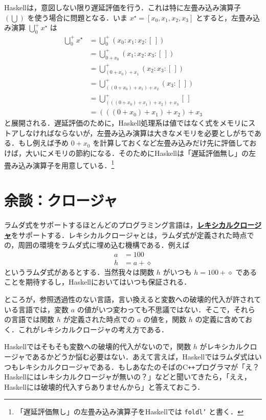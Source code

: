 \documentclass[a4paper,twocolumn]{jsbook}
\newcommand{\programminglanguage}[1]{\textsf{#1}}
\newcommand{\cxx}{\programminglanguage{C}\texttt{++}}
\newcommand{\haskell}{\programminglanguage{Haskell}}
\newcommand{\keyword}[1]{{\underline{\textbf{#1}}}}
\newcommand{\code}[1]{\texttt{#1}}
\newcommand{\mEmptyList}{{[\,]}}
\newcommand{\mAnonParam}{\diamond}
\DeclareMathOperator*{\mFold}{\bigcup}
\newcommand{\mListWith}[1]{\left[#1\right]}
\newcommand{\mList}[1]{{#1}^\mathrm{\star}}
\begin{document}
\haskell は，意図しない限り遅延評価を行う．これは特に左畳み込み演算子 $(\mFold)$ を使う場合に問題となる．いま $\mList{x}=\mListWith{x_0,x_1,x_2,x_3}$ とすると，左畳み込み演算 $\mFold^+_0\mList{x}$ は
\begin{align}
\mFold^+_0\mList{x}&=\mFold^+_0{}(x_0:x_1:x_2:\mEmptyList)\\
&=\mFold^+_{0+x_0}{}(x_1:x_2:x_3:\mEmptyList)\\
&=\mFold^+_{(0+x_0)+x_1}{}(x_2:x_3:\mEmptyList)\\
&=\mFold^+_{((0+x_0)+x_1)+x_2}{}(x_3:\mEmptyList)\\
&=\mFold^+_{(((0+x_0)+x_1)+x_2)+x_3}{}\mEmptyList\\
&=(((0+x_0)+x_1)+x_2)+x_3
\end{align}
と展開される．遅延評価のために，\haskell 処理系は値ではなく式をメモリにストアしなければならないが，左畳み込み演算は大きなメモリを必要としがちである．もし例えば予め $0+x_0$ を計算しておくなど左畳み込みだけ先に評価しておけば，大いにメモリの節約になる．そのために\haskell は「遅延評価無し」の左畳み込み演算子を用意している．\footnote{「遅延評価無し」の左畳み込み演算子を\haskell では \code{foldl'} と書く．}


% 

\section{余談：クロージャ}

ラムダ式をサポートするほとんどのプログラミング言語は，\keyword{レキシカルクロージャ}をサポートする．レキシカルクロージャとは，ラムダ式が定義された時点での，周囲の環境をラムダ式に埋め込む機構である．例えば
\begin{align}
a&=100\\
h&=a+\mAnonParam
\end{align}
というラムダ式があるとする．当然我々は関数 $h$ がいつも $h=100+\mAnonParam$ であることを期待するし，\haskell においてはいつも保証される．

ところが，参照透過性のない言語，言い換えると変数への破壊的代入が許されている言語では，変数 $a$ の値がいつ変わっても不思議ではない．そこで，それらの言語では関数 $h$ が定義された時点での $a$ の値を，関数 $h$ の定義に含めておく．これがレキシカルクロージャの考え方である．

\haskell ではそもそも変数への破壊的代入がないので，関数 $h$ がレキシカルクロージャであるかどうか悩む必要はない．あえて言えば，\haskell ではラムダ式はいつもレキシカルクロージャである．もしあなたのそばの\cxx プログラマが「え？\haskell にはレキシカルクロージャが無いの？」などと聞いてきたら，「ええ，\haskell には破壊的代入すらありませんから」と答えておこう．
\end{document}
